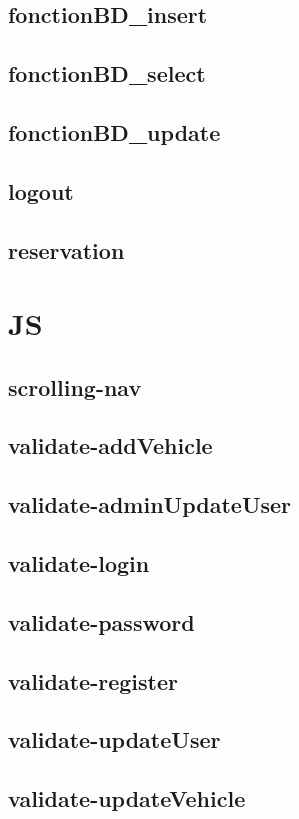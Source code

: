 \documentclass[a4paper,12pt]{report}
\begin{document}
\subsection{fonctionBD\_insert}

\subsection{fonctionBD\_select}

\subsection{fonctionBD\_update}

\subsection{logout}

\subsection{reservation}


\section{JS}

\subsection{scrolling-nav}

\subsection{validate-addVehicle}

\subsection{validate-adminUpdateUser}

\subsection{validate-login}

\subsection{validate-password}

\subsection{validate-register}

\subsection{validate-updateUser}

\subsection{validate-updateVehicle}

\end{document}
